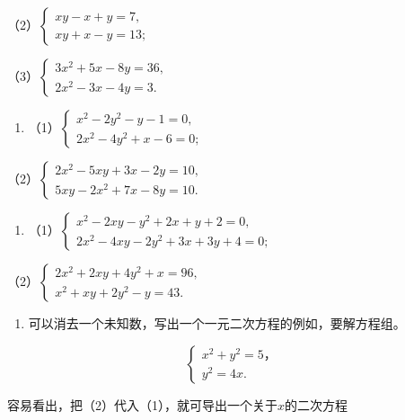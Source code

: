 （2）\(\left\{ \begin{array}{l} xy - x + y = 7, \\ xy + x - y = 13; \end{array} \right.\)

（3）\(\left\{ \begin{array}{l} 3x^{2} + 5x - 8y = 36, \\ 2x^{2} - 3x - 4y = 3. \end{array} \right.\)

\begin{enumerate}[start=2]
\item
  （1）\(\left\{ \begin{array}{l} x^{2} - 2y^{2} - y - 1 = 0, \\ 2x^{2} - 4y^{2} + x - 6 = 0; \end{array} \right.\)
\end{enumerate}

（2）\(\left\{ \begin{array}{l} 2x^{2} - 5xy + 3x - 2y = 10, \\ 5xy - 2x^{2} + 7x - 8y = 10. \end{array} \right.\)

\begin{enumerate}[start=3]
\item
  （1）\(\left\{ \begin{array}{l} x^{2} - 2xy - y^{2} + 2x + y + 2 = 0, \\ 2x^{2} - 4xy - 2y^{2} + 3x + 3y + 4 = 0; \end{array} \right.\)
\end{enumerate}

（2）\(\left\{ \begin{array}{l} 2x^{2} + 2xy + 4y^{2} + x = 96, \\ x^{2} + xy + 2y^{2} - y = 43. \end{array} \right.\)

\begin{enumerate}[start=2]
\item
  可以消去一个未知数，写出一个一元二次方程的例如，要解方程组。
\end{enumerate}

\[
\left\{ \begin{array}{l} x ^ {2} + y ^ {2} = 5\text{，} \\ y ^ {2} = 4 x. \end{array} \right. \tag{1}
\]

容易看出，把（2）代入（1），就可导出一个关于\(x\)的二次方程

